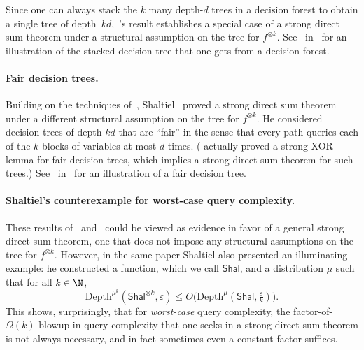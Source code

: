 \documentclass[11pt]{article}
\newcommand{\gnote}[1]{\footnote{{\bf \color{violet}Guy}: {#1}}}
\begin{document}
Since one can always stack the $k$ many depth-$d$ trees in a decision forest to obtain a single tree of depth~$kd$,~\cite{NRS94}'s result establishes a special case of a strong direct sum theorem under a structural assumption on the tree for $f^{\otimes k}$. See~ in~ for an illustration of the stacked decision tree that one gets from a decision forest. 



\paragraph{Fair decision trees.} Building on the techniques of~\cite{NRS94}, Shaltiel~\cite{Sha04} proved a strong direct sum theorem under a different structural assumption on the tree for $f^{\otimes k}$. He considered decision trees of depth $kd$ that are “fair” in the sense that every path queries each of the $k$ blocks of variables at most $d$ times. (\cite{Sha04} actually proved a strong XOR lemma for fair decision trees, which implies a strong direct sum theorem for such trees.) See~ in~ for an illustration of a fair decision tree. 



\paragraph{Shaltiel's counterexample for worst-case query complexity.}

These results of~\cite{NRS94} and~\cite{Sha04} could be viewed as evidence in favor of a general strong direct sum theorem, one that does not impose any structural assumptions on the tree for $f^{\otimes k}$. However, in the same paper Shaltiel also presented an illuminating example: he constructed a function, which we call $\mathsf{Shal}$, and a distribution $\mu$ such that for all $k\in \N$,%
\begin{equation} 
\mathrm{Depth}^{\mu^k}(\mathsf{Shal}^{\otimes k},\varepsilon) \le O\big(\mathrm{Depth}^{\mu}(\mathsf{Shal},\tfrac{\varepsilon}{k})\big).
\label{eq:shaltiel}
\end{equation}
This shows, surprisingly, that for {\sl worst-case} query complexity, the factor-of-$\Omega(k)$ blowup in query complexity that one seeks in a strong direct sum theorem is not always necessary, and in fact sometimes even a constant factor suffices. 
\end{document}

